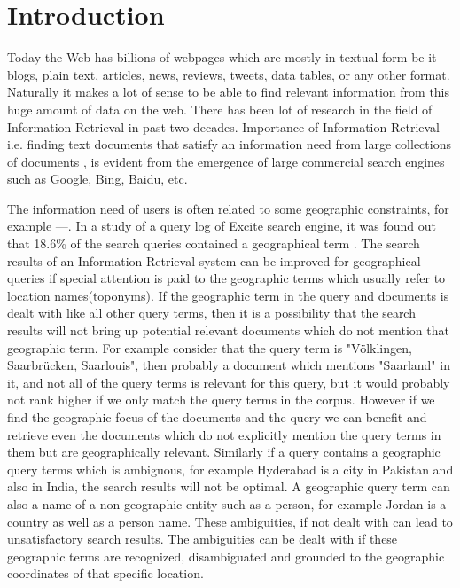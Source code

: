 \documentclass[
     11pt,         %
     a4paper,      %
     oneside,
     ]{article}
\begin{document}
\tableofcontents
\newpage





\section{Introduction}\label{sec:introduction}
Today the Web has billions of webpages which are mostly in textual form be it blogs, plain text, articles, news, reviews, tweets, data tables, or any other format. Naturally it makes a lot of sense to be able to find relevant information from this huge amount of data on the web. There has been lot of research in the field of Information Retrieval in past two decades. Importance of Information Retrieval i.e. finding text documents that satisfy an information need from large collections of documents \cite{Manning:2008:IIR:1394399}, is evident from the emergence of large commercial search engines such as Google, Bing, Baidu, etc.

The information need of users is often related to some geographic constraints, for example ---. In a study of a query log of Excite search engine, it was found out that 18.6\% of the search queries contained a geographical term \cite{Sanderson04analyzinggeographic}. The search results of an Information Retrieval system can be improved for geographical queries if special attention is paid to the geographic terms which usually refer to location names(toponyms). If the geographic term in the query and documents is dealt with like all other query terms, then it is a possibility that the search results will not bring up potential relevant documents which do not mention that geographic term. For example consider that the query term is "Völklingen, Saarbrücken, Saarlouis", then probably a document which mentions "Saarland" in it, and not all of the query terms is relevant for this query, but it would probably not rank higher if we only match the query terms in the corpus. However if we find the geographic focus of the documents and the query we can benefit and retrieve even the documents which do not explicitly mention the query terms in them but are geographically relevant. Similarly if a query contains a geographic query terms which is ambiguous, for example Hyderabad is a city in Pakistan and also in India, the search results will not be optimal. A geographic query term can also a name of a non-geographic entity such as a person, for example Jordan is a country as well as a person name. These ambiguities, if not dealt with can lead to unsatisfactory search results. The ambiguities can be dealt with if these geographic terms are recognized, disambiguated and grounded to the geographic coordinates of that specific location. 
\end{document}
